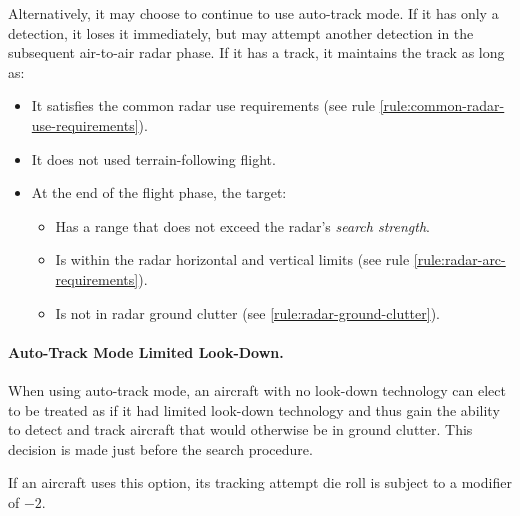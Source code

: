 {\begin{advancedrules}
Alternatively, it may choose to continue to use auto-track mode. If it has only a detection, it loses it immediately, but may attempt another detection in the subsequent air-to-air radar phase. If it has a track, it maintains the track as long as:
\begin{itemize}
    \item It satisfies the common radar use requirements (see rule \ref{rule:common-radar-use-requirements}).
    \item It does not used terrain-following flight.
    \item At the end of the flight phase, the target:
    \begin{itemize}
        \item Has a range that does not exceed the radar's \emph{search strength}.
        \item Is within the radar horizontal and vertical limits (see rule \ref{rule:radar-arc-requirements}).
        \item Is not in radar ground clutter (see  \ref{rule:radar-ground-clutter}).
    \end{itemize}
\end{itemize}


\paragraph{Auto-Track Mode Limited Look-Down.}

When using auto-track mode, an aircraft with no look-down technology can elect to be treated as if it had limited look-down technology and thus gain the ability to detect and track aircraft that would otherwise be in ground clutter. This decision is made just before the search procedure. 

If an aircraft uses this option, its tracking attempt die roll is subject to a modifier of $-2$. 


\end{advancedrules}}
